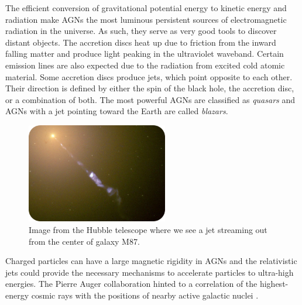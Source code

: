 The efficient conversion of gravitational potential energy to kinetic energy and radiation make AGNs the most luminous persistent sources of electromagnetic radiation in the universe. As such, they serve as very good tools to discover distant objects. The accretion discs heat up due to friction from the inward falling matter and produce light peaking in the ultraviolet waveband. Certain emission lines are also expected due to the radiation from excited cold atomic material. Some accretion discs produce jets, which point opposite to each other. Their direction is defined by either the spin of the black hole, the accretion disc, or a combination of both.  The most powerful AGNs are classified as \textit{quasars} and AGNs with a jet pointing toward the Earth are called \textit{blazars}.

\begin{figure}
\centering
\includegraphics[width=0.55\textwidth]{chapter3/img/jet_crop_rounded.jpg}
\caption{
Image from the Hubble telescope where we see a jet streaming out from the center of galaxy M87.}
\end{figure}

Charged particles can have a large magnetic rigidity in AGNs and the relativistic jets could provide the necessary mechanisms to accelerate particles to ultra-high energies. The Pierre Auger collaboration hinted to a correlation of the highest-energy cosmic rays with the positions of nearby active galactic nuclei \cite{Abraham:2007si}.

